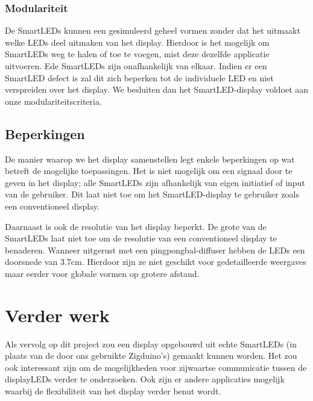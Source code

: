 \documentclass{article}
\begin{document}
\subsubsection{Modulariteit}

De SmartLEDs kunnen een gesimuleerd geheel vormen zonder dat het uitmaakt welke LEDs deel uitmaken van het display. Hierdoor is het mogelijk om SmartLEDs weg te halen of toe te voegen, mist deze dezelfde applicatie uitvoeren. Ede SmartLEDs zijn onafhankelijk van elkaar. Indien er een SmartLED defect is zal dit zich beperken tot de individuele LED en niet verspreiden over het display. We besluiten dan het SmartLED-display voldoet aan onze modulariteitscriteria.

\subsection{Beperkingen}
De manier waarop we het display samenstellen legt enkele beperkingen op wat betreft de mogelijke toepassingen. Het is niet mogelijk om een signaal door te geven in het display; alle SmartLEDs zijn afhankelijk van eigen initiatief of input van de gebruiker. Dit laat niet toe om het SmartLED-display te gebruiker zoals een conventioneel display. 

Daarnaast is ook de resolutie van het display beperkt. De grote van de SmartLEDs laat niet toe om de resolutie van een conventioneel display te benaderen. Wanneer uitgerust met een pingpongbal-diffuser hebben de LEDs een doorsnede van 3.7cm. Hierdoor zijn ze niet geschikt voor gedetailleerde weergaves maar eerder voor globale vormen op grotere afstand.



\section{Verder werk}
Als vervolg op dit project zou een display opgebouwd uit echte SmartLEDs (in plaats van de door ons gebruikte Zigduino's) gemaakt kunnen worden. Het zou ook interessant zijn om de mogelijkheden voor zijwaartse communicatie tussen de displayLEDs verder te onderzoeken. Ook zijn er andere applicaties mogelijk waarbij de flexibiliteit van het display verder benut wordt.



\end{document}
